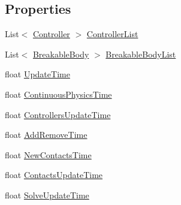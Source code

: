 \subsection*{Properties}
\begin{DoxyCompactItemize}
\item 
List$<$ \hyperlink{class_farseer_physics_1_1_controllers_1_1_controller}{Controller} $>$ \hyperlink{class_farseer_physics_1_1_dynamics_1_1_world_a5cdff99e8f504152c79c5f7917dfdadb}{Controller\+List}
\item 
List$<$ \hyperlink{class_farseer_physics_1_1_dynamics_1_1_breakable_body}{Breakable\+Body} $>$ \hyperlink{class_farseer_physics_1_1_dynamics_1_1_world_aea0e80ecc94dfc580fe748dfbbd4227b}{Breakable\+Body\+List}
\item 
float \hyperlink{class_farseer_physics_1_1_dynamics_1_1_world_a48a6ab5b43a81669bdd031b0002b68e0}{Update\+Time}
\item 
float \hyperlink{class_farseer_physics_1_1_dynamics_1_1_world_a49060967dec88a723157b5e66e8815f8}{Continuous\+Physics\+Time}
\item 
float \hyperlink{class_farseer_physics_1_1_dynamics_1_1_world_ab40da58a2a31928e02511cd39bc8871b}{Controllers\+Update\+Time}
\item 
float \hyperlink{class_farseer_physics_1_1_dynamics_1_1_world_aa82073926ea06b7f51ba3e0e428527b6}{Add\+Remove\+Time}
\item 
float \hyperlink{class_farseer_physics_1_1_dynamics_1_1_world_a3e5b1b784859654686eb13b01006f329}{New\+Contacts\+Time}
\item 
float \hyperlink{class_farseer_physics_1_1_dynamics_1_1_world_a0cdddaf66ba8a41ffbf2bd04b7356797}{Contacts\+Update\+Time}
\item 
float \hyperlink{class_farseer_physics_1_1_dynamics_1_1_world_af8b17d134fbadec351d2cd1d73917908}{Solve\+Update\+Time}

\end{DoxyCompactItemize}
